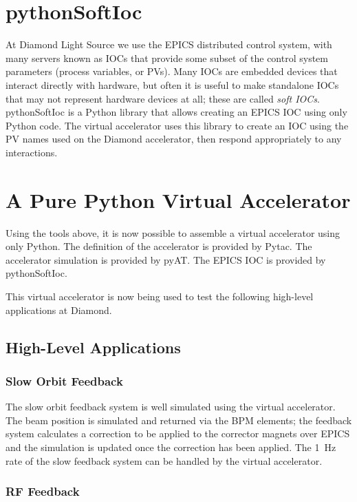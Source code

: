\documentclass[a4paper,
               keeplastbox,   %
               ]{jacow}
\begin{document}
\section{pythonSoftIoc}

At Diamond Light Source we use the EPICS distributed control system, with many
servers known as IOCs that provide some subset of the control system parameters
(process variables, or PVs). Many IOCs are embedded devices that interact
directly with hardware, but often it is useful to make standalone IOCs that may
not represent hardware devices at all; these are called \textit{soft IOCs}.
pythonSoftIoc \cite{pythonioc} is a Python library that allows creating an EPICS IOC
using only Python code. The virtual accelerator uses this library to create
an IOC using the PV names used on the Diamond accelerator, then respond
appropriately to any interactions.

\section{A Pure Python Virtual Accelerator}

Using the tools above, it is now possible to assemble a virtual accelerator
using only Python. The definition of the accelerator is provided by Pytac.
The accelerator simulation is provided by pyAT. The EPICS IOC is provided by 
pythonSoftIoc.

This virtual accelerator is now being used to test the following high-level applications
at Diamond.

\subsection{High-Level Applications}

\subsubsection{Slow Orbit Feedback}

The slow orbit feedback system is well simulated using the virtual accelerator.
The beam position is simulated and returned via the BPM elements; the feedback
system calculates a correction to be applied to the corrector magnets over EPICS
and the simulation is updated once the correction has been applied. The \SI{1}{Hz} rate
of the slow feedback system can be handled by the virtual accelerator.

\subsubsection{RF Feedback} 
\end{document}
